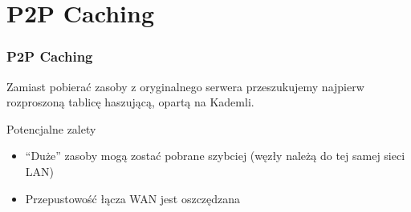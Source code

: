 \documentclass{beamer}
\begin{document}
% 
% 
% 
% 
%  
% 
% 
% 

\section{P2P Caching}
\begin{frame}
\frametitle{P2P Caching}

\begin{block}{}
Zamiast pobierać zasoby z oryginalnego serwera przeszukujemy najpierw rozproszoną tablicę haszującą, opartą na Kademli.
\end{block}

\begin{block}{Potencjalne zalety}
\begin{itemize}
  \item ``Duże'' zasoby mogą zostać pobrane szybciej (węzły należą do tej samej sieci LAN)
  \item Przepustowość łącza WAN jest oszczędzana
\end{itemize}
\end{block}

\end{frame}
\end{document}
